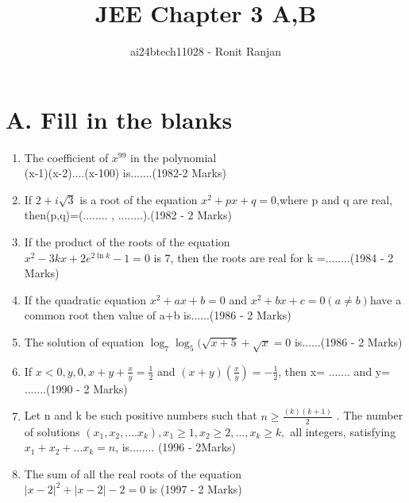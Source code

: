 \documentclass[journal,12pt,twocolumn]{IEEEtran}
\theoremstyle{remark}
\begin{document}

\vspace{3cm}

\title{JEE Chapter 3 A,B}
\author{ai24btech11028 - Ronit Ranjan}
\maketitle
\newpage
\bigskip
\section*{A. Fill in the blanks}
\begin{enumerate}
    \item The coefficient of $x^{99}$ in the polynomial\\ (x-1)(x-2)....(x-100) is.......\hfill (1982-2 Marks)
      
    \item If $2+i\sqrt{3}$ is a root of the equation $x^2 + px +q =0$,where p and q are real, then(p,q)=(........ , ........).\hfill (1982 - 2 Marks)
    
    \item If the product of the roots of the equation\\ $x^2 -3kx +2e^{2\ln{k}} -1=0$ is $7$, then the roots are real for k =........\hfill (1984 - 2 Marks)
    
    \item If the quadratic equation $x^2 + ax +b=0$ and $x^2 + bx + c=0 (a \ne b)$have a common root then value of a+b is......\hfill (1986 - 2 Marks)
    
    \item The solution of equation $\log_{7}\log_{5}(\sqrt{x+5}+\sqrt{x} = 0$ is......\hfill (1986 - 2 Marks)
    
    \item If $x<0, y,0, x + y + \frac{x}{y} = \frac{1}{2}$ and $(x+y)(\frac{x
    }{y}) = -\frac{1}{2}$, then x= ....... and y= .......\hfill (1990 - 2 Marks)
    
    \item Let n and k be such positive numbers such that $n \geq \frac{(k)(k+1)}{2}$ . The number of solutions $(x_1,x_2,....x_k), x_1 \geq 1, x_2 \geq 2,...,x_k \geq k, $ all integers, satisfying $x_1+x_2+...x_k = n$, is........  \hfill (1996 - 2Marks) 
    \item The sum of all the real roots of the equation\\$|x-2|^2+|x-2|-2 = 0$ is \hfill (1997 - 2 Marks)
\end{enumerate}
\end{document}
